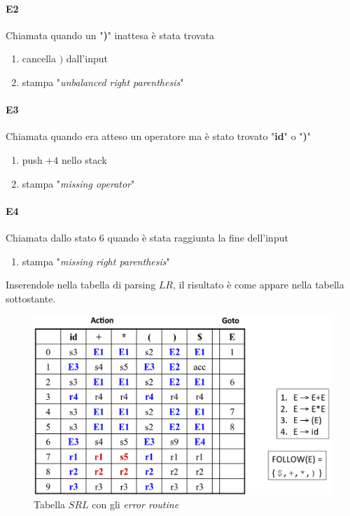 \paragraph{E2}
Chiamata quando un "\textbf{)}" inattesa \`e stata trovata
\begin{enumerate}
\item cancella $)$ dall'input
\item stampa "\textit{unbalanced right parenthesis}"
\end{enumerate}

\paragraph{E3}
Chiamata quando era atteso un operatore ma \`e stato trovato "\textbf{id}" o
"\textbf{)}"
\begin{enumerate}
\item push $+4$ nello stack
\item stampa "\textit{missing operator}"
\end{enumerate}

\paragraph{E4}
Chiamata dallo stato 6 quando \`e stata raggiunta la fine dell'input
\begin{enumerate}
\item stampa "\textit{missing right parenthesis}"
\end{enumerate}

Inserendole nella tabella di parsing $LR$, il risultato \`e come appare nella
tabella sottostante.

\begin{figure}[H]
\centering
\includegraphics[scale=0.4]{res/image/phrase_recovery_table}
\caption{Tabella $SRL$ con gli \textit{error routine}}
\label{img:phrase_recovery_table}
\end{figure}
